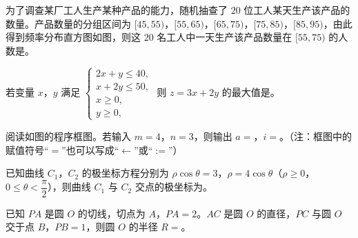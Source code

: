 \Needspace{0.4\textheight}
\begin{question}
为了调查某厂工人生产某种产品的能力，随机抽查了 $20$ 位工人某天生产该产品的数量。产品数量的分组区间为 $[45,55)$，$[55,65)$，$[65,75)$，$[75,85)$，$[85,95)$，由此得到频率分布直方图如图，则这 $20$ 名工人中一天生产该产品数量在 $[55,75)$ 的人数是\gkblank{}。
\nopagebreak[4]
\begin{center}\end{center}
\nopagebreak[4]
\end{question}
\begingroup
\renewenvironment{question}{\Needspace{0.46\textheight}}{}
\begin{question}
若变量 $x$，$y$ 满足 $\begin{cases}2x+y\leqslant40,\\ x+2y\leqslant50,\\ x\geqslant0,\\ y\geqslant0,\end{cases}$ 则 $z=3x+2y$ 的最大值是\gkblank{}。

\Needspace{0.4\textheight}
\end{question}
\endgroup
\begin{question}
阅读如图的程序框图。若输入 $m=4$，$n=3$，则输出 $a=$\gkblank{}，$i=$\gkblank{}。（注：框图中的赋值符号“$=$”也可以写成“$\leftarrow$”或“$:=$”）
\nopagebreak[4]
\begin{center}\end{center}
\nopagebreak[4]
\end{question}
\begin{question}
已知曲线 $C_1$，$C_2$ 的极坐标方程分别为 $\rho\cos\theta=3$，$\rho=4\cos\theta$（$\rho\geqslant0$，$0\leqslant\theta<\dfrac{\pi}{2}$），则曲线 $C_1$ 与 $C_2$ 交点的极坐标为\gkblank{}。

\end{question}
\begin{question}
已知 $PA$ 是圆 $O$ 的切线，切点为 $A$，$PA=2$。$AC$ 是圆 $O$ 的直径，$PC$ 与圆 $O$ 交于点 $B$，$PB=1$，则圆 $O$ 的半径 $R=$\gkblank{}。

\end{question}

